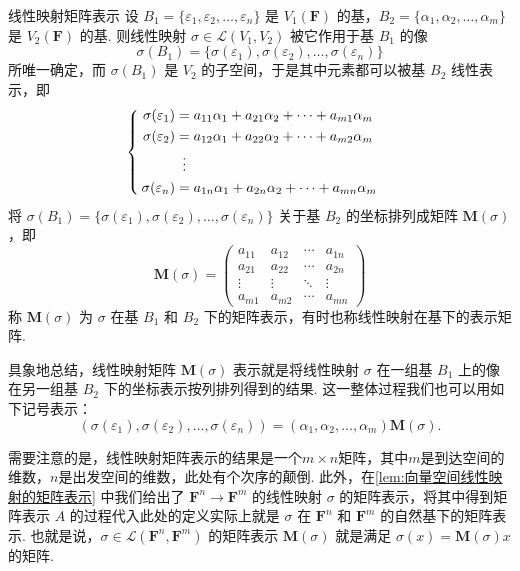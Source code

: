 \begin{definition}{}{线性映射矩阵表示}
    设 $B_1 = \{\varepsilon_1,\varepsilon_2,\ldots,\varepsilon_n\}$ 是 $V_1(\mathbf{F})$ 的基，$B_2 = \{\alpha_1,\alpha_2,\ldots,\alpha_m\}$ 是 $V_2(\mathbf{F})$ 的基. 则线性映射 $\sigma \in \mathcal{L}(V_1,V_2)$ 被它作用于基 $B_1$ 的像
    \[\sigma(B_1) = \{\sigma(\varepsilon_1),\sigma(\varepsilon_2),\ldots,\sigma(\varepsilon_n)\}\]
    所唯一确定，而 $\sigma(B_1)$ 是 $V_2$ 的子空间，于是其中元素都可以被基 $B_2$ 线性表示，即
    \[ \begin{cases} \begin{aligned}
                \sigma(\varepsilon_1) & = a_{11}\alpha_1+a_{21}\alpha_2+\cdots+a_{m1}\alpha_m \\
                \sigma(\varepsilon_2) & = a_{12}\alpha_1+a_{22}\alpha_2+\cdots+a_{m2}\alpha_m \\
                                      & \vdotswithin{=}                                       \\
                \sigma(\varepsilon_n) & = a_{1n}\alpha_1+a_{2n}\alpha_2+\cdots+a_{mn}\alpha_m
            \end{aligned} \end{cases} \]
    将 $\sigma(B_1)=\{\sigma(\varepsilon_1),\sigma(\varepsilon_2),\ldots,\sigma(\varepsilon_n)\}$ 关于基 $B_2$ 的坐标排列成矩阵 $\mathbf{M}(\sigma)$，即
    \[
        \mathbf{M}(\sigma)=\begin{pmatrix}
            a_{11} & a_{12} & \cdots & a_{1n} \\
            a_{21} & a_{22} & \cdots & a_{2n} \\
            \vdots & \vdots & \ddots & \vdots \\
            a_{m1} & a_{m2} & \cdots & a_{mn}
        \end{pmatrix}
    \]
    称 $\mathbf{M}(\sigma)$ 为 $\sigma$ 在基 $B_1$ 和 $B_2$ 下的矩阵表示，有时也称线性映射在基下的表示矩阵.
\end{definition}

具象地总结，线性映射矩阵 $\mathbf{M}(\sigma)$ 表示就是将线性映射 $\sigma$ 在一组基 $B_1$ 上的像在另一组基 $B_2$ 下的坐标表示按列排列得到的结果. 这一整体过程我们也可以用如下记号表示：
\begin{equation}\label{eq:7:线性映射矩阵表示}
    (\sigma(\varepsilon_1),\sigma(\varepsilon_2),\ldots,\sigma(\varepsilon_n))=(\alpha_1,\alpha_2,\ldots,\alpha_m)\mathbf{M}(\sigma).
\end{equation}

需要注意的是，线性映射矩阵表示的结果是一个$m\times n$矩阵，其中$m$是到达空间的维数，$n$是出发空间的维数，此处有个次序的颠倒. 此外，在\autoref{lem:向量空间线性映射的矩阵表示} 中我们给出了 $\mathbf{F}^n \to \mathbf{F}^m$ 的线性映射 $\sigma$ 的矩阵表示，将其中得到矩阵表示 $A$ 的过程代入此处的定义实际上就是 $\sigma$ 在 $\mathbf{F}^n$ 和 $\mathbf{F}^m$ 的自然基下的矩阵表示. 也就是说，$\sigma \in \mathcal{L}(\mathbf{F}^n, \mathbf{F}^m)$ 的矩阵表示 $\mathbf{M}(\sigma)$ 就是满足 $\sigma(x) = \mathbf{M}(\sigma)x$ 的矩阵.

